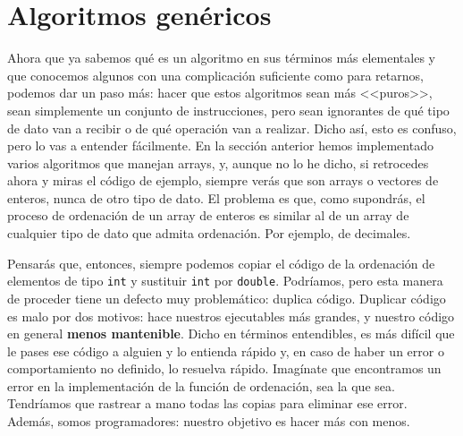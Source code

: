 \documentclass[a4paper]{article}
\begin{document}

\section{Algoritmos genéricos}
Ahora que ya sabemos qué es un algoritmo en sus términos más elementales y
que conocemos algunos con una complicación suficiente como para retarnos,
podemos dar un paso más: hacer que estos algoritmos sean más <<puros>>, sean
simplemente un conjunto de instrucciones, pero sean ignorantes de qué tipo
de dato van a recibir o de qué operación van a realizar. Dicho así, esto es
confuso, pero lo vas a entender fácilmente. En la sección anterior hemos
implementado varios algoritmos que manejan arrays, y, aunque no lo he dicho,
si retrocedes ahora y miras el código de ejemplo, siempre verás que son
arrays o vectores de enteros, nunca de otro tipo de dato. El problema es que,
como supondrás, el proceso de ordenación de un array de enteros es similar
al de un array de cualquier tipo de dato que admita ordenación. Por ejemplo,
de decimales.

Pensarás que, entonces, siempre podemos copiar el código de la ordenación de
elementos de tipo \verb!int! y sustituir \verb!int! por \verb!double!.
Podríamos, pero esta manera de proceder tiene un defecto muy problemático:
duplica código. Duplicar código es malo por dos motivos: hace nuestros
ejecutables más grandes, y nuestro código en general \textbf{menos mantenible}.
Dicho en términos entendibles, es más difícil que le pases ese código a alguien
y lo entienda rápido y, en caso de haber un error o comportamiento no definido,
lo resuelva rápido. Imagínate que encontramos un error en la implementación de
la función de ordenación, sea la que sea. Tendríamos que rastrear a mano todas
las copias para eliminar ese error. Además, somos programadores:
nuestro objetivo es hacer más con menos.
\end{document}
